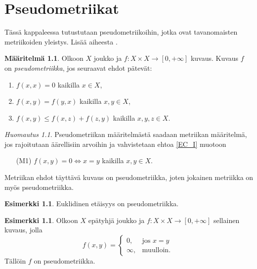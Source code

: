 \documentclass[12pt,a4paper,leqno]{report}
\theoremstyle{plain}
\theoremstyle{definition}
\newtheorem{maar}[equation]{Määritelmä}
\newtheorem{esim}[equation]{Esimerkki}
\theoremstyle{remark}
\newtheorem{huom}[equation]{Huomautus}
\begin{document}
\chapter{Pseudometriikat}
Tässä kappaleessa tutustutaan pseudometriikoihin, jotka ovat tavanomaisten metriikoiden yleistys. Lisää aiheesta \cite{Eom2}.
\begin{maar}\label{pseudo_maar}
Olkoon $X$ joukko ja $f\colon X\times X\rightarrow [0,+\infty]$ 
kuvaus. Kuvaus $f$ on \emph{pseudometriikka}, jos seuraavat ehdot pätevät:
\begin{enumerate} [label=(P\arabic*),ref=(P\arabic*)]
\item\label{EC_I} $f(x,x)=0$ kaikilla $x\in X$,
\item\label{EC_II} $f(x,y)=f(y,x)$ kaikilla $x,y\in X$,
\item\label{EC_III} $f(x,y)\leq f(x,z)+f(z,y)$ kaikilla $x,y,z\in X$.
\end{enumerate}
\end{maar}
\begin{huom}
Pseudometriikan määritelmästä saadaan metriikan määritelmä, jos rajoitutaan äärellisiin arvoihin ja vahvistetaan ehtoa \ref{EC_I} muotoon 
\begin{enumerate} %
\item[(M1)]\label{M1} $f(x,y)=0\Leftrightarrow x=y$ kaikilla $x,y\in X.$
\end{enumerate}
Metriikan ehdot täyttävä kuvaus on pseudometriikka, 
joten %
jokainen metriikka on myös pseudometriikka.
\end{huom}
\begin{esim}%
Euklidinen etäisyys on pseudometriikka.
\end{esim}
\begin{esim}%
Olkoon $X$ epätyhjä joukko ja $f\colon X\times X\rightarrow [0,+\infty]$ sellainen kuvaus, jolla
\begin{equation*}
f(x,y) = \begin{cases} 0, & \mbox{jos } x=y\\
\infty, & \mbox{muulloin. } \end{cases}
\end{equation*}
Tällöin $f$ on pseudometriikka.
\end{esim}
\end{document}
